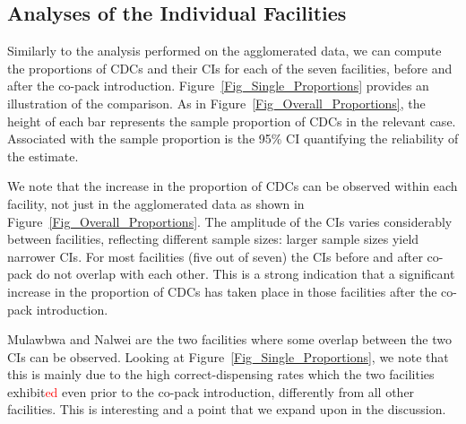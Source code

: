 \documentclass[a4paper, 12pt]{article}
\newcommand{\red}{\textcolor{red}}
\begin{document}


\subsection{Analyses of the Individual Facilities}
Similarly to the analysis performed on the agglomerated data, we can compute the proportions of CDCs and their CIs for each of the seven facilities, before and after the co-pack introduction. 
Figure~\ref{Fig_Single_Proportions} provides an illustration of the comparison.
As in Figure~\ref{Fig_Overall_Proportions}, the height of each bar represents the sample proportion of CDCs in the relevant case. Associated with the sample proportion is the 95\% CI quantifying the reliability of the estimate.

We note that the increase in the proportion of CDCs can be observed within each facility, 
not just in the agglomerated data as shown in Figure~\ref{Fig_Overall_Proportions}.
The amplitude of the CIs varies considerably between facilities, reflecting different sample sizes: larger sample sizes yield narrower CIs. For most facilities (five out of seven) the CIs before and after co-pack do not overlap with each other. This is a strong indication that a significant increase in the proportion of CDCs has taken place in those facilities after the co-pack introduction. 

Mulawbwa and Nalwei are the two facilities where some overlap between the two CIs can be observed. Looking at Figure~\ref{Fig_Single_Proportions}, we note that this is mainly due to the high correct-dispensing rates which the two facilities exhibit\red{ed} even prior to the co-pack introduction, differently from all other facilities. This is interesting and a point that we expand upon in the discussion.

\end{document}
